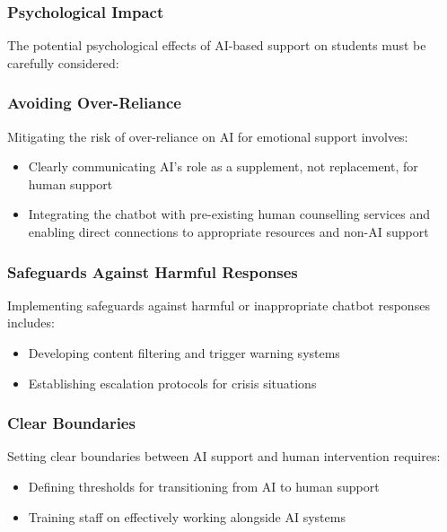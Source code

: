 \documentclass[14pt,a4paper]{article}
\begin{document}
\begin{multicols}{2}
\subsubsection{Psychological Impact}
The potential psychological effects of AI-based support on students must be carefully considered:

\subsubsection*{Avoiding Over-Reliance}
Mitigating the risk of over-reliance on AI for emotional support \textit{\parencite[p. 746]{Miner2022}} involves:
\begin{itemize}
    \item Clearly communicating AI's role as a supplement, not replacement, for human support
    \item Integrating the chatbot with pre-existing human counselling services and enabling direct connections to appropriate resources and non-AI support
\end{itemize}

\subsubsection*{Safeguards Against Harmful Responses}
Implementing safeguards against harmful or inappropriate chatbot responses \textit{\parencite[p. e11510]{Bickmore2021}} includes:
\begin{itemize}
    \item Developing content filtering and trigger warning systems
    \item Establishing escalation protocols for crisis situations
\end{itemize}


\subsubsection*{Clear Boundaries}
Setting clear boundaries between AI support and human intervention \textit{\parencite{APA2024}} requires:
\begin{itemize}
    \item Defining thresholds for transitioning from AI to human support
    \item Training staff on effectively working alongside AI systems
\end{itemize}


\end{multicols}
\end{document}
